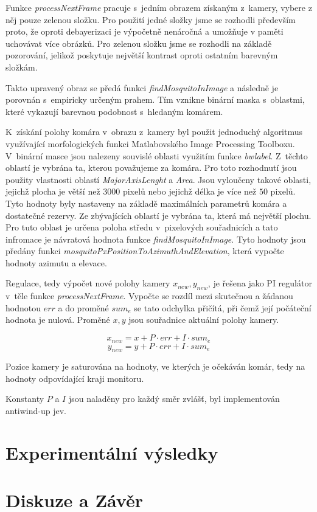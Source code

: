 \documentclass[a4paper,10pt]{article}
\begin{document}
		Funkce \textit{processNextFrame} pracuje s~jedním obrazem získaným z~kamery, vybere z něj pouze zelenou složku.
		Pro použití jedné složky jsme se rozhodli především proto, že oproti debayerizaci je výpočetně nenáročná a 
		umožňuje v paměti uchovávat více obrázků. Pro zelenou složku jsme se rozhodli na základě pozorování, 
		jelikož poskytuje největší kontrast oproti ostatním barevným složkám.

		Takto upravený obraz se předá funkci \textit{findMosquitoInImage} a 
		následně je porovnán s~empiricky určeným prahem.
		Tím vznikne binární maska s~oblastmi, které vykazují barevnou podobnost s~hle\-da\-ným komárem. 
		
		K~získání polohy komára v~obrazu z~kamery byl použit jednoduchý algoritmus
		využívající morfologických funkci Matlabovského Image Processing Toolboxu. 
		V~binární masce jsou nalezeny souvislé oblasti využitím funkce \textit{bwlabel}.
		Z~těchto oblastí je vybrána ta, kterou považujeme za komára. Pro toto
		rozhodnutí jsou použity vlastnosti oblastí \textit{MajorAxisLenght} a
		\textit{Area}. Jsou vyloučeny takové oblasti, jejichž plocha je větší než $3000$
		pixelů nebo jejichž délka je více než $50$ pixelů. Tyto hodnoty byly nastaveny
		na základě maximálních parametrů komára a dostatečné rezervy. Ze zbývajících
		oblastí je vybrána ta, která má největší plochu. Pro tuto oblast je určena
		poloha středu v~pixelových souřadnicích a tato infromace je návratová hodnota
		funkce \textit{findMosquitoInImage}. 
		Tyto hodnoty jsou předány funkci \textit{mosquitoPxPositionToAzimuthAndElevation},
		která vypočte hodnoty azimutu a elevace. 

	        Regulace, tedy výpočet nové polohy kamery $x_{new}, y_{new}$, je řešena jako PI
		regulátor v~těle funkce \textit{processNextFrame}. 
	        Vypočte se rozdíl mezi skutečnou a žádanou hodnotou $err$ a do
		proměné $sum_e$ se tato odchylka přičítá, při čemž její počáteční hodnota je
		nulová. Proměné $x, y$ jsou souřadnice aktuální polohy kamery.

		$$x_{new} = x + P\cdot err + I\cdot sum_e$$
		$$y_{new} = y + P\cdot err + I\cdot sum_e$$

		Pozice kamery je saturována na hodnoty, ve
		kterých je očekáván komár, tedy na hodnoty odpovídající kraji monitoru.

		Konstanty $P$ a $I$ jsou naladěny pro každý směr zvlášť, byl implementován antiwind-up jev.

\section{Experimentální výsledky}

\section{Diskuze a Závěr}



\end{document}
